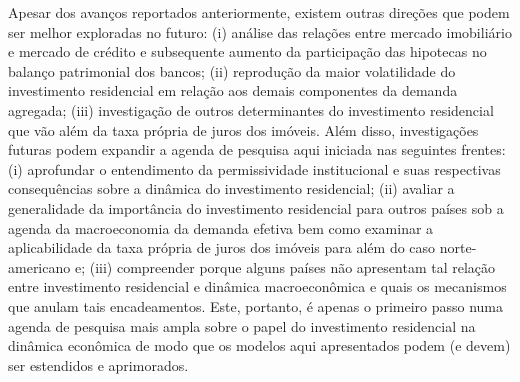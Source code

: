 
Apesar dos avanços reportados anteriormente, existem outras direções que podem ser melhor exploradas no futuro: (i) análise das relações entre mercado imobiliário e mercado de crédito e subsequente aumento da participação das hipotecas no balanço patrimonial dos bancos; (ii) reprodução da maior volatilidade do investimento residencial em relação aos demais componentes da demanda agregada; (iii) investigação de outros determinantes do investimento residencial que vão além da taxa própria de juros dos imóveis.
Além disso, investigações futuras podem expandir a agenda de pesquisa aqui iniciada nas seguintes frentes:
	(i) aprofundar o entendimento da permissividade institucional e suas respectivas consequências sobre a dinâmica do investimento residencial; 
	(ii) avaliar a generalidade da importância do investimento residencial para outros países sob a agenda da macroeconomia da demanda efetiva bem como examinar a aplicabilidade da taxa própria de juros dos imóveis para além do caso norte-americano e;
	(iii) compreender porque alguns países não apresentam tal relação entre investimento residencial e dinâmica macroeconômica e quais os mecanismos que anulam tais encadeamentos.
Este, portanto, é apenas o primeiro passo numa agenda de pesquisa mais ampla sobre o papel do investimento residencial na dinâmica econômica de modo que os modelos aqui apresentados podem (e devem) ser estendidos e aprimorados.